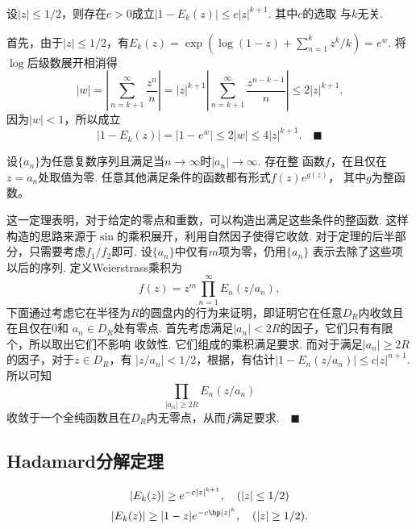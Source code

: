   \begin{lemma}[自然因子估计]
    \label{lemma: 自然因子}
    设$|z|\le 1/2$，则存在$c>0$成立$|1-E_k(z)|\le c|z|^{k+1}$. 其中$c$的选取
    与$k$无关.
  \end{lemma}
  \proof
    首先，由于$|z|\le 1/2$，有$E_k(z)=\exp(\log(1-z)+\sum_{n=1}^k z^k/k)=e^w$. 将
    $\log$后级数展开相消得
    \[
      |w| = \left| \sum_{n=k+1}^\infty\frac{z^n}{n} \right|
       = |z|^{k+1}\left| \sum_{n=k+1}^\infty\frac{z^{n-k-1}}{n} \right|
       \le 2|z|^{k+1}.
    \]
    因为$|w|<1$，所以成立
    \[
      |1-E_k(z)| = |1-e^w| \le 2|w|\le 4|z|^{k+1}.\quad\blacksquare
    \]

  \begin{thm}
    设$\{a_n\}$为任意复数序列且满足当$n\to\infty$时$|a_n|\to\infty$. 存在整
    函数$f$，在且仅在$z=a_n$处取值为零. 任意其他满足条件的函数都有形式$f(z)e^{g(z)}$，
    其中$g$为整函数。
  \end{thm}
  \remark
    这一定理表明，对于给定的零点和重数，可以构造出满足这些条件的整函数. 这样构造的思路来源于$\sin$的乘积展开，利用自然因子使得它收敛.
  \proof
    对于定理的后半部分，只需要考虑$f_1/f_2$即可. 设$\{a_n\}$中仅有$m$项为零，仍用$\{a_n\}$
    表示去除了这些项以后的序列. 定义Weierstrass乘积为
    \begin{equation}
      \label{equ: Weierstrass乘积}
      f(z)=z^m\prod_{n=1}^\infty E_n(z/a_n),
    \end{equation}
    下面通过考虑它在半径为$R$的圆盘内的行为来证明，即证明它在任意$D_R$内收敛且在且仅在$0$和
    $a_n\in D_R$处有零点. 首先考虑满足$|a_n|<2R$的因子，它们只有有限个，所以取出它们不影响
    收敛性. 它们组成的乘积满足要求. 而对于满足$|a_n|\ge 2R$的因子，对于$z\in D_R$，有
    $|z/a_n|<1/2$，根据，有估计$|1-E_n(z/a_n)|\le c|z|^{n+1}$.
    所以可知
    \[
      \prod_{|a_n|\ge 2R}E_n(z/a_n)
    \]
    收敛于一个全纯函数且在$D_R$内无零点，从而$f$满足要求.$\quad\blacksquare$


\subsection{Hadamard分解定理}

  \begin{lemma}[自然因子估计]
    \label{lemma: 自然因子估计2}
    \begin{gather*}
      |E_k(z)|\ge e^{-c|z|^{k+1}},\quad (|z|\le 1/2) \\
      |E_k(z)|\ge |1-z|e^{-c\hp|z|^k},\quad (|z|\ge 1/2).
    \end{gather*}
  \end{lemma}

